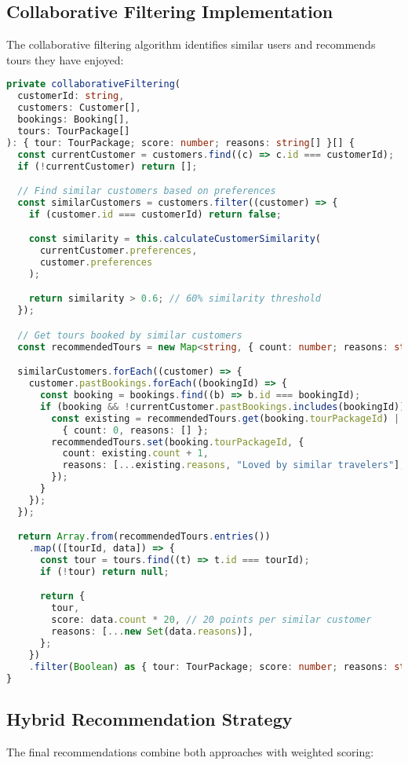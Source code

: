 \documentclass[12pt,a4paper]{article}
\begin{document}
\subsection{Collaborative Filtering Implementation}
The collaborative filtering algorithm identifies similar users and recommends tours they have enjoyed:

\begin{lstlisting}[language=typescript, caption=Collaborative Filtering Algorithm]
private collaborativeFiltering(
  customerId: string,
  customers: Customer[],
  bookings: Booking[],
  tours: TourPackage[]
): { tour: TourPackage; score: number; reasons: string[] }[] {
  const currentCustomer = customers.find((c) => c.id === customerId);
  if (!currentCustomer) return [];

  // Find similar customers based on preferences
  const similarCustomers = customers.filter((customer) => {
    if (customer.id === customerId) return false;

    const similarity = this.calculateCustomerSimilarity(
      currentCustomer.preferences, 
      customer.preferences
    );

    return similarity > 0.6; // 60% similarity threshold
  });

  // Get tours booked by similar customers
  const recommendedTours = new Map<string, { count: number; reasons: string[] }>();

  similarCustomers.forEach((customer) => {
    customer.pastBookings.forEach((bookingId) => {
      const booking = bookings.find((b) => b.id === bookingId);
      if (booking && !currentCustomer.pastBookings.includes(bookingId)) {
        const existing = recommendedTours.get(booking.tourPackageId) || 
          { count: 0, reasons: [] };
        recommendedTours.set(booking.tourPackageId, {
          count: existing.count + 1,
          reasons: [...existing.reasons, "Loved by similar travelers"],
        });
      }
    });
  });

  return Array.from(recommendedTours.entries())
    .map(([tourId, data]) => {
      const tour = tours.find((t) => t.id === tourId);
      if (!tour) return null;

      return {
        tour,
        score: data.count * 20, // 20 points per similar customer
        reasons: [...new Set(data.reasons)],
      };
    })
    .filter(Boolean) as { tour: TourPackage; score: number; reasons: string[] }[];
}
\end{lstlisting}

\subsection{Hybrid Recommendation Strategy}
The final recommendations combine both approaches with weighted scoring:
\end{document}
